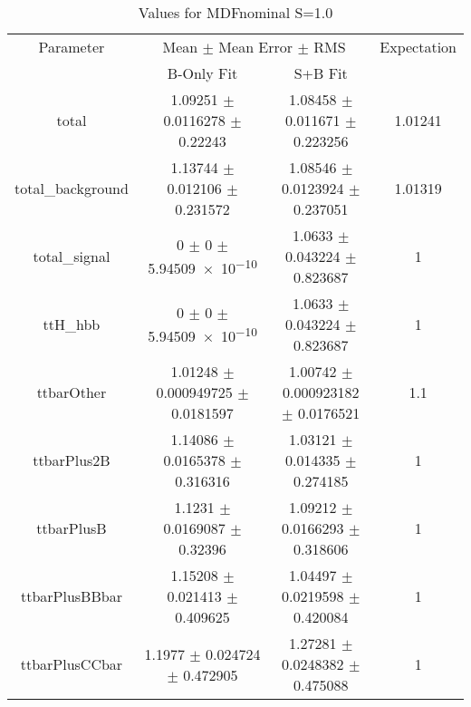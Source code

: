 \begin{table}
\centering
\caption{Values for MDFnominal S=1.0}
\begin{tabular}{cccc}
\toprule
Parameter & \multicolumn{2}{c}{Mean $\pm$ Mean Error $\pm$ RMS} & Expectation\\
 & B-Only Fit & S+B Fit & \\
\midrule
total & \num{1.09251} $\pm$ \num{0.0116278} $\pm$ \num{0.22243} & \num{1.08458} $\pm$ \num{0.011671} $\pm$ \num{0.223256} & \num{1.01241}\\
total\_background & \num{1.13744} $\pm$ \num{0.012106} $\pm$ \num{0.231572} & \num{1.08546} $\pm$ \num{0.0123924} $\pm$ \num{0.237051} & \num{1.01319}\\
total\_signal & \num{0} $\pm$ \num{0} $\pm$ \num{5.94509e-10} & \num{1.0633} $\pm$ \num{0.043224} $\pm$ \num{0.823687} & \num{1}\\
ttH\_hbb & \num{0} $\pm$ \num{0} $\pm$ \num{5.94509e-10} & \num{1.0633} $\pm$ \num{0.043224} $\pm$ \num{0.823687} & \num{1}\\
ttbarOther & \num{1.01248} $\pm$ \num{0.000949725} $\pm$ \num{0.0181597} & \num{1.00742} $\pm$ \num{0.000923182} $\pm$ \num{0.0176521} & \num{1.1}\\
ttbarPlus2B & \num{1.14086} $\pm$ \num{0.0165378} $\pm$ \num{0.316316} & \num{1.03121} $\pm$ \num{0.014335} $\pm$ \num{0.274185} & \num{1}\\
ttbarPlusB & \num{1.1231} $\pm$ \num{0.0169087} $\pm$ \num{0.32396} & \num{1.09212} $\pm$ \num{0.0166293} $\pm$ \num{0.318606} & \num{1}\\
ttbarPlusBBbar & \num{1.15208} $\pm$ \num{0.021413} $\pm$ \num{0.409625} & \num{1.04497} $\pm$ \num{0.0219598} $\pm$ \num{0.420084} & \num{1}\\
ttbarPlusCCbar & \num{1.1977} $\pm$ \num{0.024724} $\pm$ \num{0.472905} & \num{1.27281} $\pm$ \num{0.0248382} $\pm$ \num{0.475088} & \num{1}\\
\bottomrule
\end{tabular}
\end{table}